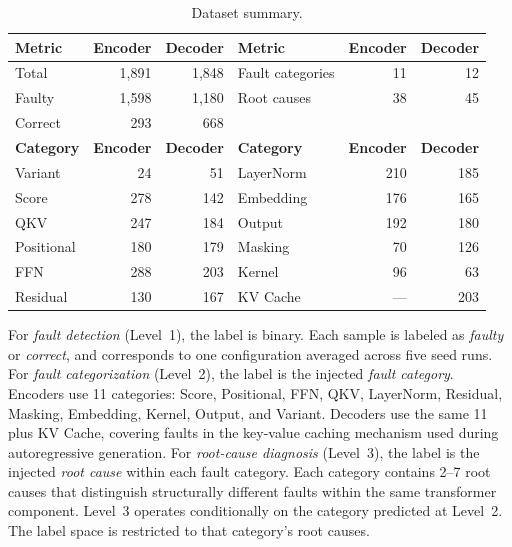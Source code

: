 \begin{table}[t]
\centering
\caption{Dataset summary.}
\label{tab:data_accounting}
\begin{tabular}{@{} lrr @{\hspace{2em}} lrr @{}}
\toprule
\textbf{Metric} & \textbf{Encoder} & \textbf{Decoder} & \textbf{Metric} & \textbf{Encoder} & \textbf{Decoder} \\
\midrule
Total   & 1{,}891 & 1{,}848 & Fault categories & 11 & 12 \\
Faulty  & 1{,}598 & 1{,}180 & Root causes      & 38 & 45 \\
Correct & 293     & 668     &                  &    &    \\
\midrule
\textbf{Category} & \textbf{Encoder} & \textbf{Decoder} & \textbf{Category} & \textbf{Encoder} & \textbf{Decoder} \\
\midrule
Variant    & 24  & 51  & LayerNorm & 210 & 185 \\
Score      & 278 & 142 & Embedding & 176 & 165 \\
QKV        & 247 & 184 & Output    & 192 & 180 \\
Positional & 180 & 179 & Masking   & 70  & 126 \\
FFN        & 288 & 203 & Kernel    & 96  & 63  \\
Residual   & 130 & 167 & KV Cache  & --- & 203 \\
\bottomrule
\end{tabular}
\end{table}


For \emph{fault detection} (Level~1), the label is binary. Each sample is labeled as \textit{faulty} or \textit{correct}, and corresponds to one configuration averaged across five seed runs. For \emph{fault categorization} (Level~2), the label is the injected \emph{fault category}. Encoders use 11 categories: Score, Positional, FFN, QKV, LayerNorm, Residual, Masking, Embedding, Kernel, Output, and Variant. Decoders use the same 11 plus KV Cache, covering faults in the key-value caching mechanism used during autoregressive generation. For \emph{root-cause diagnosis} (Level~3), the label is the injected \emph{root cause} within each fault category. Each category contains 2--7 root causes that distinguish structurally different faults within the same transformer component. Level~3 operates conditionally on the category predicted at Level~2. The label space is restricted to that category's root causes.

